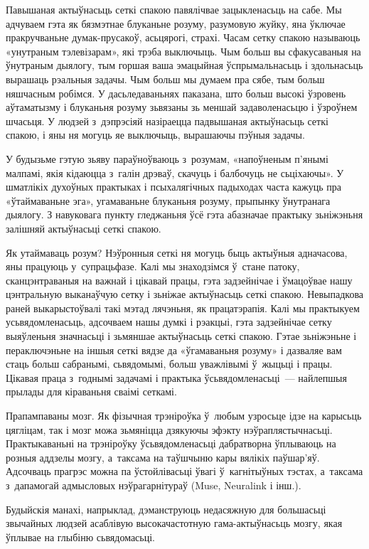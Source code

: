 Павышаная актыўнасьць сеткі спакою павялічвае зацыкленасьць на сабе. Мы адчуваем гэта як бязмэтнае блуканьне розуму, разумовую жуйку, яна ўключае пракручваньне думак-прусакоў, асьцярогі, страхі. Часам сетку спакою называюць «унутраным тэлевізарам», які трэба выключыць. Чым больш вы сфакусаваныя на ўнутраным дыялогу, тым горшая ваша эмацыйная ўспрымальнасьць і здольнасьць вырашаць рэальныя задачы. Чым больш мы думаем пра сябе, тым больш няшчасным робімся. У дасьледаваньнях паказана, што больш высокі ўзровень аўтаматызму і блуканьня розуму зьвязаны зь меншай задаволенасьцю і ўзроўнем шчасьця. У людзей з~дэпрэсіяй назіраецца падвышаная актыўнасьць сеткі спакою, і яны ня могуць яе выключыць, вырашаючы пэўныя задачы.

У будызьме гэтую зьяву параўноўваюць з~розумам, «напоўненым п'янымі малпамі, якія кідаюцца з~галін дрэваў, скачуць і балбочуць не сьціхаючы». У шматлікіх духоўных практыках і псыхалягічных падыходах часта кажуць пра «ўтаймаваньне эга», угамаваньне блуканьня розуму, прыпынку ўнутранага дыялогу. З навуковага пункту гледжаньня ўсё гэта абазначае практыку зьніжэньня залішняй актыўнасьці сеткі спакою.

Як утаймаваць розум? Нэўронныя сеткі ня могуць быць актыўныя адначасова, яны працуюць у~супрацьфазе. Калі мы знаходзімся ў~стане патоку, сканцэнтраваныя на важнай і цікавай працы, гэта задзейнічае і ўмацоўвае нашу цэнтральную выканаўчую сетку і зьніжае актыўнасьць сеткі спакою. Невыпадкова раней выкарыстоўвалі такі мэтад лячэньня, як працатэрапія. Калі мы практыкуем усьвядомленасьць, адсочваем нашы думкі і рэакцыі, гэта задзейнічае сетку выяўленьня значнасьці і зьмяншае актыўнасьць сеткі спакою. Гэтае зьніжэньне і пераключэньне на іншыя сеткі вядзе да «ўгамаваньня розуму» і дазваляе вам стаць больш сабранымі, сьвядомымі, больш уважлівымі ў~жыцьці і працы. Цікавая праца з~годнымі задачамі і практыка ўсьвядомленасьці~--- найлепшыя прылады для кіраваньня сваімі сеткамі.

Прапампаваны мозг. Як фізычная трэніроўка ў~любым узросьце ідзе на карысьць цягліцам, так і мозг можа зьмяніцца дзякуючы эфэкту нэўраплястычнасьці. Практыкаваньні на трэніроўку ўсьвядомленасьці дабратворна ўплываюць на розныя аддзелы мозгу, а~таксама на таўшчыню кары вялікіх паўшар'яў. Адсочваць прагрэс можна па ўстойлівасьці ўвагі ў~кагнітыўных тэстах, а~таксама з~дапамогай адмысловых нэўрагарнітураў (Muse, Neuralink і інш.).

Будыйскія манахі, напрыклад, дэманструюць недасяжную для большасьці звычайных людзей асаблівую высокачастотную гама-актыўнасьць мозгу, якая ўплывае на глыбіню сьвядомасьці.

